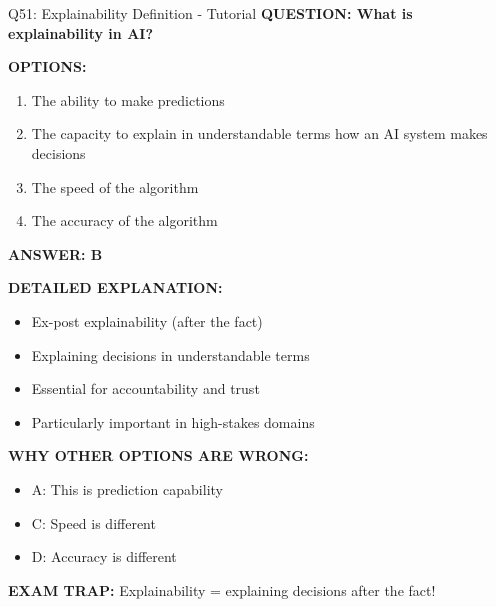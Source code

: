 \documentclass[8pt]{beamer}
\begin{document}
	\begin{frame}{Q51: Explainability Definition - Tutorial}
		\fontsize{6.5}{7.5}\selectfont
		\textbf{QUESTION: What is explainability in AI?}
		
		\vspace{0.1cm}
		\textbf{OPTIONS:}
		\begin{enumerate}
			\item The ability to make predictions
			\item The capacity to explain in understandable terms how an AI system makes decisions
			\item The speed of the algorithm
			\item The accuracy of the algorithm
		\end{enumerate}
		
		\vspace{0.1cm}
		\textcolor{myblue}{\textbf{ANSWER: B}}
		
		\vspace{0.1cm}
		\textbf{DETAILED EXPLANATION:}
		\begin{itemize}
			\item Ex-post explainability (after the fact)
			\item Explaining decisions in understandable terms
			\item Essential for accountability and trust
			\item Particularly important in high-stakes domains
		\end{itemize}
		
		\vspace{0.1cm}
		\textcolor{myred}{\textbf{WHY OTHER OPTIONS ARE WRONG:}}
		\begin{itemize}
			\item \textcolor{myred}{A:} This is prediction capability
			\item \textcolor{myred}{C:} Speed is different
			\item \textcolor{myred}{D:} Accuracy is different
		\end{itemize}
		
		\textcolor{myred}{\textbf{EXAM TRAP:}} Explainability = \textcolor{myblue}{explaining decisions after the fact}!
	\end{frame}
	
\end{document}
